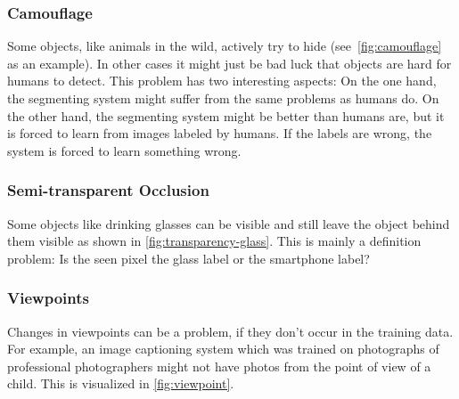 \subsubsection{Camouflage}
Some objects, like animals in the wild, actively try to hide
(see~\cref{fig:camouflage} as an example). In other cases it might just be bad
luck that objects are hard for humans to detect. This problem has two
interesting aspects: On the one hand, the segmenting system might suffer from
the same problems as humans do. On the other hand, the segmenting system might
be better than humans are, but it is forced to learn from images labeled by
humans. If the labels are wrong, the system is forced to learn something wrong.

\subsubsection{Semi-transparent Occlusion}
Some objects like drinking glasses can be visible and still leave the object
behind them visible as shown in \cref{fig:transparency-glass}. This is mainly a
definition problem: Is the seen pixel the glass label or the smartphone label?

\subsubsection{Viewpoints}
Changes in viewpoints can be a problem, if they don't occur in the training
data. For example, an image captioning system which was trained on photographs
of professional photographers might not have photos from the point of view of
a child. This is visualized in \cref{fig:viewpoint}.



